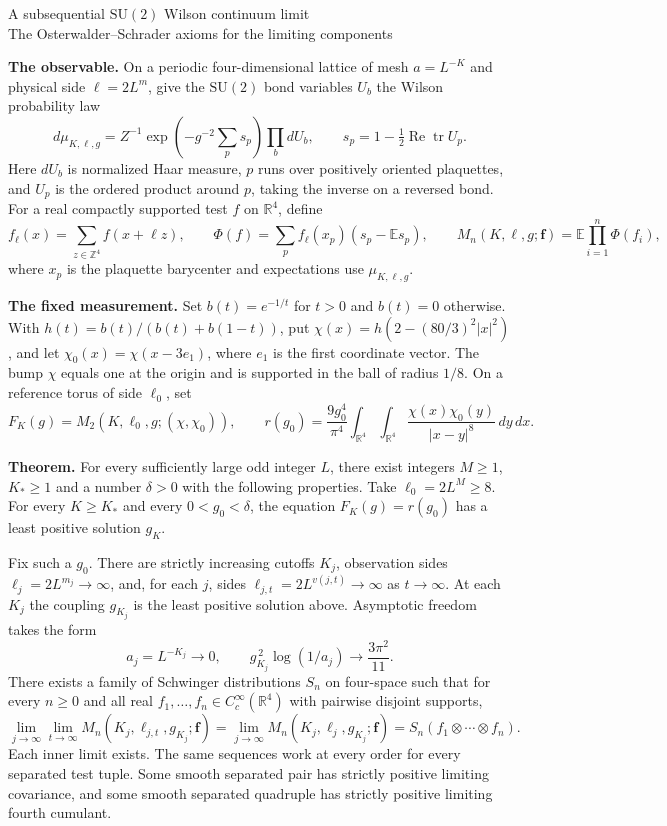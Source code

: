 \documentclass[11pt,letterpaper]{article}
\newcommand{\R}{\mathbb R}
\newcommand{\E}{\mathbb E}
\newcommand{\SU}{\mathrm{SU}}
\begin{document}
\begin{center}
{\LARGE A subsequential $\SU(2)$ Wilson continuum limit}\\[4pt]
{\large The Osterwalder--Schrader axioms for the limiting components}
\end{center}

\textbf{The observable.}
On a periodic four-dimensional lattice of mesh $a=L^{-K}$ and physical side
$\ell=2L^m$, give the $\SU(2)$ bond variables $U_b$ the Wilson probability law
\[
  d\mu_{K,\ell,g}=Z^{-1}\exp\!\left(-g^{-2}\sum_p s_p\right)\prod_b dU_b,
  \qquad s_p=1-\tfrac12\operatorname{Re}\operatorname{tr}U_p .
\]
Here $dU_b$ is normalized Haar measure, $p$ runs over positively oriented
plaquettes, and $U_p$ is the ordered product around $p$, taking the inverse on
a reversed bond. For a real compactly supported test $f$ on $\R^4$, define
\[
 f_\ell(x)=\sum_{z\in\mathbb Z^4}f(x+\ell z),\qquad
 \Phi(f)=\sum_p f_\ell(x_p)(s_p-\E s_p),
 \qquad
 M_n(K,\ell,g;\mathbf f)=\E\!\prod_{i=1}^n\Phi(f_i),
\]
where $x_p$ is the plaquette barycenter and expectations use $\mu_{K,\ell,g}$.

\textbf{The fixed measurement.}
Set $b(t)=e^{-1/t}$ for $t>0$ and $b(t)=0$ otherwise. With
$h(t)=b(t)/(b(t)+b(1-t))$, put
$\chi(x)=h(2-(80/3)^2|x|^2)$, and let $\chi_0(x)=\chi(x-3e_1)$,
where $e_1$ is the first coordinate vector. The bump $\chi$ equals one at the
origin and is supported in the ball of radius $1/8$. On a reference torus
of side $\ell_0$, set
\[
 F_K(g)=M_2(K,\ell_0,g;(\chi,\chi_0)),\qquad
 r(g_0)=\frac{9g_0^4}{\pi^4}\int_{\R^4}\!\int_{\R^4}
 \frac{\chi(x)\chi_0(y)}{|x-y|^8}\,dy\,dx .
\]

\textbf{Theorem.}
For every sufficiently large odd integer $L$, there exist integers $M\ge1$,
$K_*\ge1$ and a number $\delta>0$ with the following properties.
Take $\ell_0=2L^M\ge8$. For every $K\ge K_*$ and every $0<g_0<\delta$,
the equation $F_K(g)=r(g_0)$ has a least positive solution $g_K$.

Fix such a $g_0$. There are strictly increasing cutoffs $K_j$, observation
sides $\ell_j=2L^{m_j}\to\infty$, and, for each $j$, sides
$\ell_{j,t}=2L^{v(j,t)}\to\infty$ as $t\to\infty$. At each $K_j$ the
coupling $g_{K_j}$ is the least positive solution above. Asymptotic freedom takes the form
\[
 a_j=L^{-K_j}\longrightarrow0,\qquad
 g_{K_j}^{\,2}\log(1/a_j)\longrightarrow\frac{3\pi^2}{11}.
\]
There exists a family of Schwinger distributions $S_n$ on four-space
such that for every $n\ge0$ and all real $f_1,\ldots,f_n\in C_c^\infty(\R^4)$
with pairwise disjoint supports,
\[
 \lim_{j\to\infty}\lim_{t\to\infty} M_n(K_j,\ell_{j,t},g_{K_j};\mathbf f)
 =\lim_{j\to\infty}M_n(K_j,\ell_j,g_{K_j};\mathbf f)
 =S_n(f_1\otimes\cdots\otimes f_n).
\]
Each inner limit exists. The same sequences work at every order for every
separated test tuple. Some smooth separated pair has strictly positive
limiting covariance, and some smooth separated quadruple has strictly
positive limiting fourth cumulant.
\end{document}
